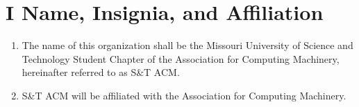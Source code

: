 \section{I \textendash{} Name, Insignia, and Affiliation}
\begin{enumerate}[label=\Alph*.]
  \item The name of this organization shall be the Missouri University of
  Science and Technology Student Chapter of the Association for Computing
  Machinery, hereinafter referred to as S\&T ACM.
  \item S\&T ACM will be affiliated with the Association for Computing Machinery.
\end{enumerate}
